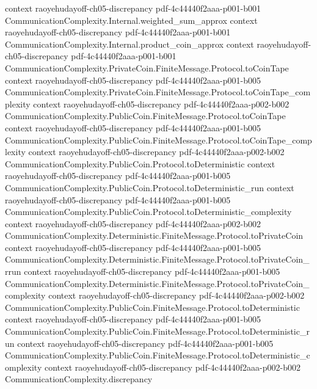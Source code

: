 \begin{lemma}
  {context}
  {raoyehudayoff-ch05-discrepancy}
  {pdf-4c44440f2aaa-p001-b001}
\proofstep
  {CommunicationComplexity.Internal.weighted_sum_approx}
  {context}
  {raoyehudayoff-ch05-discrepancy}
  {pdf-4c44440f2aaa-p001-b001}
\proofstep
  {CommunicationComplexity.Internal.product_coin_approx}
  {context}
  {raoyehudayoff-ch05-discrepancy}
  {pdf-4c44440f2aaa-p001-b001}
\proofstep
  {CommunicationComplexity.PrivateCoin.FiniteMessage.Protocol.toCoinTape}
  {context}
  {raoyehudayoff-ch05-discrepancy}
  {pdf-4c44440f2aaa-p001-b005}
\proofstep
  {CommunicationComplexity.PrivateCoin.FiniteMessage.Protocol.toCoinTape_complexity}
  {context}
  {raoyehudayoff-ch05-discrepancy}
  {pdf-4c44440f2aaa-p002-b002}
\proofstep
  {CommunicationComplexity.PublicCoin.FiniteMessage.Protocol.toCoinTape}
  {context}
  {raoyehudayoff-ch05-discrepancy}
  {pdf-4c44440f2aaa-p001-b005}
\proofstep
  {CommunicationComplexity.PublicCoin.FiniteMessage.Protocol.toCoinTape_complexity}
  {context}
  {raoyehudayoff-ch05-discrepancy}
  {pdf-4c44440f2aaa-p002-b002}
\proofstep
  {CommunicationComplexity.PublicCoin.Protocol.toDeterministic}
  {context}
  {raoyehudayoff-ch05-discrepancy}
  {pdf-4c44440f2aaa-p001-b005}
\proofstep
  {CommunicationComplexity.PublicCoin.Protocol.toDeterministic_run}
  {context}
  {raoyehudayoff-ch05-discrepancy}
  {pdf-4c44440f2aaa-p001-b005}
\proofstep
  {CommunicationComplexity.PublicCoin.Protocol.toDeterministic_complexity}
  {context}
  {raoyehudayoff-ch05-discrepancy}
  {pdf-4c44440f2aaa-p002-b002}
\proofstep
  {CommunicationComplexity.Deterministic.FiniteMessage.Protocol.toPrivateCoin}
  {context}
  {raoyehudayoff-ch05-discrepancy}
  {pdf-4c44440f2aaa-p001-b005}
\proofstep
  {CommunicationComplexity.Deterministic.FiniteMessage.Protocol.toPrivateCoin_rrun}
  {context}
  {raoyehudayoff-ch05-discrepancy}
  {pdf-4c44440f2aaa-p001-b005}
\proofstep
  {CommunicationComplexity.Deterministic.FiniteMessage.Protocol.toPrivateCoin_complexity}
  {context}
  {raoyehudayoff-ch05-discrepancy}
  {pdf-4c44440f2aaa-p002-b002}
\proofstep
  {CommunicationComplexity.PublicCoin.FiniteMessage.Protocol.toDeterministic}
  {context}
  {raoyehudayoff-ch05-discrepancy}
  {pdf-4c44440f2aaa-p001-b005}
\proofstep
  {CommunicationComplexity.PublicCoin.FiniteMessage.Protocol.toDeterministic_run}
  {context}
  {raoyehudayoff-ch05-discrepancy}
  {pdf-4c44440f2aaa-p001-b005}
\proofstep
  {CommunicationComplexity.PublicCoin.FiniteMessage.Protocol.toDeterministic_complexity}
  {context}
  {raoyehudayoff-ch05-discrepancy}
  {pdf-4c44440f2aaa-p002-b002}
\proofstep
  {CommunicationComplexity.discrepancy}

\end{lemma}
